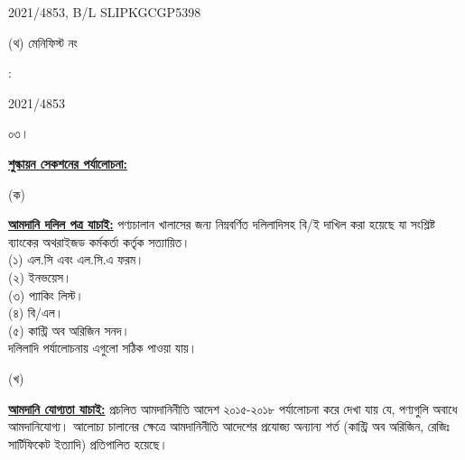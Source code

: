 \documentclass[12pt]{article}
\newcommand{\blno}{SLIPKGCGP5398}
\newcommand{\menifest}{2021/4853}
\begin{document}
\begin{minipage}[t]{0.53\linewidth}
{\menifest}, B/L {\blno}
\\
\end{minipage}
\begin{minipage}[t]{0.05\linewidth}
\hspace*{1em}
\end{minipage}
\begin{minipage}[t]{0.40\linewidth}
(থ) মেনিফিস্ট নং
\end{minipage}
\begin{minipage}[t]{0.02\linewidth}
:
\end{minipage}
\begin{minipage}[t]{0.53\linewidth}
{\menifest}
\\
\end{minipage}
\normalsize
\begin{minipage}[t]{0.05\linewidth}
০৩।
\end{minipage}
\begin{minipage}[t]{0.95\linewidth}
\underline{\textbf{শুল্কায়ন সেকশনের পর্যালোচনা:}}
\end{minipage}
\begin{minipage}[t]{0.05\linewidth}
\hspace{1em}
\end{minipage}
\begin{minipage}[t]{0.05\linewidth}
(ক)
\end{minipage}
\begin{minipage}[t]{0.90\linewidth}
\underline{\textbf{আমদানি দলিল পত্র যাচাই:}}
পণ্যচালান খালাসের জন্য নিম্নবর্ণিত দলিলাদিসহ বি/ই দাখিল করা
হয়েছে যা সংশ্লিষ্ট ব্যাংকের অথরাইজড কর্মকর্তা কর্তৃক সত্যায়িত।
\\
(১) এল.সি এবং এল.সি.এ ফরম।
\\
(২) ইনভয়েস।
\\
(৩) প্যাকিং লিস্ট।
\\
(৪) বি/এল।
\\
(৫) কান্ট্রি অব অরিজিন সনদ।
\\
দলিলাদি পর্যালোচনায় এগুলো
সঠিক পাওয়া যায়।
\\
\end{minipage}
\begin{minipage}[t]{0.05\linewidth}
\hspace{1em}
\end{minipage}
\begin{minipage}[t]{0.05\linewidth}
(খ)
\end{minipage}
\begin{minipage}[t]{0.90\linewidth}
\underline{\textbf{আমদানি যোগ্যতা যাচাই:}}
প্রচলিত আমদানিনীতি আদেশ ২০১৫-২০১৮ পর্যালোচনা করে দেখা যায় যে, পণ্যগুলি অবাধে আমদানিযোগ্য।
আলোচ্য চালানের ক্ষেত্রে আমদানিনীতি আদেশের প্রযোজ্য অন্যান্য শর্ত (কান্ট্রি অব অরিজিন, রেজিঃ
সার্টিফিকেট ইত্যাদি) প্রতিপালিত হয়েছে।
\end{minipage}
\end{document}
